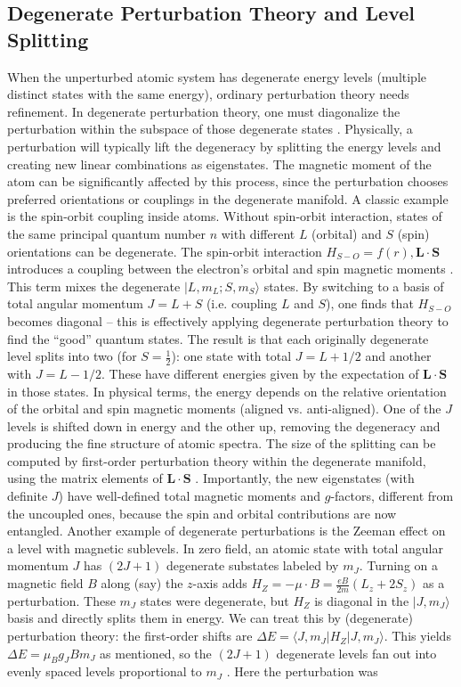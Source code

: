 \documentclass[12pt]{article}
\begin{document}
    \subsection{Degenerate Perturbation Theory and Level Splitting}
        When the unperturbed atomic system has degenerate energy levels (multiple distinct states with the same energy), ordinary perturbation theory needs refinement. In degenerate perturbation theory, one must diagonalize the perturbation within the subspace of those degenerate states \cite{PerturbationTheory}. Physically, a perturbation will typically lift the degeneracy by splitting the energy levels and creating new linear combinations as eigenstates. The magnetic moment of the atom can be significantly affected by this process, since the perturbation chooses preferred orientations or couplings in the degenerate manifold. A classic example is the spin-orbit coupling inside atoms. Without spin-orbit interaction, states of the same principal quantum number $n$ with different $L$ (orbital) and $S$ (spin) orientations can be degenerate. The spin-orbit interaction $H_{S-O} = f(r), \mathbf{L}\cdot \mathbf{S}$ introduces a coupling between the electron’s orbital and spin magnetic moments \cite{PerturbationTheory}. This term mixes the degenerate $|L, m_L; S, m_S\rangle$ states. By switching to a basis of total angular momentum $J=L+S$ (i.e. coupling $L$ and $S$), one finds that $H_{S-O}$ becomes diagonal – this is effectively applying degenerate perturbation theory to find the “good” quantum states. The result is that each originally degenerate level splits into two (for $S=\tfrac{1}{2}$): one state with total $J = L+1/2$ and another with $J = L-1/2$. These have different energies given by the expectation of $\mathbf{L}\cdot \mathbf{S}$ in those states. In physical terms, the energy depends on the relative orientation of the orbital and spin magnetic moments (aligned vs. anti-aligned). One of the $J$ levels is shifted down in energy and the other up, removing the degeneracy and producing the fine structure of atomic spectra. The size of the splitting can be computed by first-order perturbation theory within the degenerate manifold, using the matrix elements of $\mathbf{L}\cdot \mathbf{S}$ \cite{PerturbationTheory}. Importantly, the new eigenstates (with definite $J$) have well-defined total magnetic moments and $g$-factors, different from the uncoupled ones, because the spin and orbital contributions are now entangled. Another example of degenerate perturbations is the Zeeman effect on a level with magnetic sublevels. In zero field, an atomic state with total angular momentum $J$ has $(2J+1)$ degenerate substates labeled by $m_J$. Turning on a magnetic field $B$ along (say) the $z$-axis adds $H_Z = -\mu\cdot B = \frac{eB}{2m}(L_z + 2S_z)$ \cite{ZeemanUT} as a perturbation. These $m_J$ states were degenerate, but $H_Z$ is diagonal in the $|J, m_J\rangle$ basis and directly splits them in energy. We can treat this by (degenerate) perturbation theory: the first-order shifts are $\Delta E = \langle J,m_J|H_Z|J,m_J\rangle$. This yields $\Delta E = \mu_B g_J B m_J$ as mentioned, so the $(2J+1)$ degenerate levels fan out into evenly spaced levels proportional to $m_J$ \cite{Zeeman}. Here the perturbation was 
\end{document}
